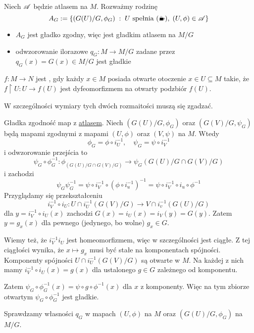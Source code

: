 \label{atlas:gladki:iloraz}
Niech $\mathcal{A}$ będzie atlasem na $M$. Rozważmy rodzinę
$$A_G:=\{(G(U)/G,\phi_G)\;:\;U\text{ spełnia (\Coffeecup)},\;(U,\phi)\in\set{A}\}$$


\begin{itemize}
    \item[\PHtunny] $A_G$ jest gładko zgodny, więc jest gładkim atlasem na $M/G$
    \item[\PHtunny] odwzorowanie ilorazowe $q_G:M\to M/G$ zadane przez $q_G(x)=G(x)\in M/G$ jest gładkie
\end{itemize}

\begin{definition}[DUPAAA]
$f:M\to N$ jest , gdy każdy $x\in M$ posiada otwarte otoczenie $x\in U\subseteq M$ takie, że $f\restriction U:U\to f(U)$ jest dyfeomorfizmem na otwarty podzbiór $f(U)$.

W szczególności wymiary tych dwóch rozmaitości muszą się zgadzać.
\end{definition}

Gładka zgodność map z \hyperref[atlas:gladki:iloraz]{atlasem}. Niech $(G(U)/G,\phi_G)$ oraz $(G(V)/G,\psi_G)$ będą mapami zgodnymi z mapami $(U,\phi)$ oraz $(V,\psi)$ na $M$. Wtedy
$$\phi_G=\phi\circ i_U^{-1},\quad\psi_G=\psi\circ i_V^{-1}$$
i odwzorowanie przejścia to
$$\psi_G\circ\phi_G^{-1}:\phi_(G(U)/G\cap G(V)/G)\to\psi_G(G(U)/G\cap G(V)/G)$$
i zachodzi
$$\psi_G\psi_G^{-1}=\psi\circ i_V^{-1}\circ(\phi\circ i_u^{-1})^{-1}=\psi\circ i_V^{-1}\circ i_u\circ\phi^{-1}$$
Przyglądamy się przekształceniu
$$i_V^{-1}\circ i_U:U\cap i_U^{-1}(G(V)/G)\to V\cap i_v^{-1} (G(U)/G)$$
dla $y=i_V^{-1}\circ i_U(x)$ zachodzi $G(x)=i_U(x)=i_V(y)=G(y)$. Zatem $y=g_x(x)$ dla pewnego (jedynego, bo wolne) $g_x\in G$. 

Wiemy też, że $i_V^{-1}i_U$ jest homeomorfizmem, więc w szczególności jest ciągłe.
Z tej ciągłości wynika, że $x\mapsto g_x$ musi być stałe na komponentach spójności. Komponenty spójności $U\cap i_U^{-1}(G(V)/G)$ są otwarte w $M$. Na każdej z nich mamy $i_V^{-1}\circ i_U(x)=g(x)$ dla ustalonego $g\in G$ zależnego od komponentu.

Zatem $\psi_G\circ\phi_G^{-1}(x)=\psi\circ g\circ\phi^{-1}(x)$ dla $x$ z komponenty. Więc na tym zbiorze otwartym $\psi_G\circ\phi_G^{-1}$ jest gładkie.

Sprawdzamy własności $q_G$ w mapach $(U,\phi)$ na $M$ oraz $(G(U)/G,\phi_G)$ na $M/G$.

